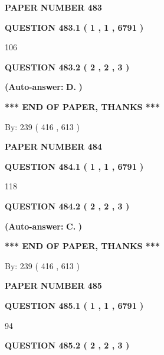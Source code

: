 \documentclass{ctexart}
\begin{document}
   
\newpage 
\setcounter{page}{ 
   483001 } 
   
   
 {\textbf{ \Large{ PAPER NUMBER  483  }}}
   
   
   
   
  
  
{\textbf{\large{QUESTION
483.1 
 ( 1 , 1 , 6791 )
}}}

106
  
  
{\textbf{\large{QUESTION
483.2 
 ( 2 , 2 , 3 )
}}}
 
 
{\textbf{(Auto-answer:}}
{\textbf{\large{
D.}}}
{\textbf{)}}
 
 
   
   
   
   
\vspace{1.0in} 
{\textbf{\large{ *** END OF PAPER, THANKS *** }}} 
   
   
\hspace{1.0in} By: 
 239 ( 416 ,  613 )
   
   
   
   
\newpage 
\setcounter{page}{ 
   484001 } 
   
   
 {\textbf{ \Large{ PAPER NUMBER  484  }}}
   
   
   
   
  
  
{\textbf{\large{QUESTION
484.1 
 ( 1 , 1 , 6791 )
}}}

118
  
  
{\textbf{\large{QUESTION
484.2 
 ( 2 , 2 , 3 )
}}}
 
 
{\textbf{(Auto-answer:}}
{\textbf{\large{
C.}}}
{\textbf{)}}
 
 
   
   
   
   
\vspace{1.0in} 
{\textbf{\large{ *** END OF PAPER, THANKS *** }}} 
   
   
\hspace{1.0in} By: 
 239 ( 416 ,  613 )
   
   
   
   
\newpage 
\setcounter{page}{ 
   485001 } 
   
   
 {\textbf{ \Large{ PAPER NUMBER  485  }}}
   
   
   
   
  
  
{\textbf{\large{QUESTION
485.1 
 ( 1 , 1 , 6791 )
}}}

94
  
  
{\textbf{\large{QUESTION
485.2 
 ( 2 , 2 , 3 )
}}}
 
\end{document}
